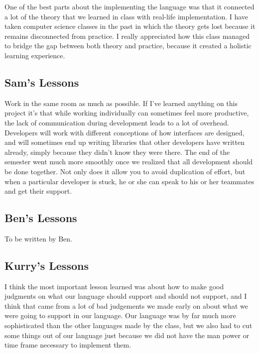 \documentclass{report}
\begin{document}
One of the best parts about the implementing the language was that it connected a lot of the theory that we learned in class with real-life implementation.  I have taken computer science classes in the past in which the theory gets lost because it remains disconnected from practice. I really appreciated how this class managed to bridge the gap between both theory and practice, because it created a holistic learning experience.



\subsection{Sam's Lessons}
\label{sub:sams-lessons}

Work in the same room as much as possible. If I've learned anything on this
project it's that while working individually can sometimes feel more
productive, the lack of communication during development leads to a lot of
overhead. Developers will work with different conceptions of how interfaces are
designed, and will sometimes end up writing libraries that other developers
have written already, simply because they didn't know they were there. The end
of the semester went much more smoothly once we realized that all development
should be done together. Not only does it allow you to avoid duplication of effort, but
when a particular developer is stuck, he or she can speak to his or her teammates and
get their support.

\subsection{Ben's Lessons} \label{sub:bens-lessons}

To be written by Ben.

\subsection{Kurry's Lessons}
\label{sub:kurrys-lessons}

I think the most important lesson learned was about how to make good judgments
on what our language should support and should not support, and I think that
came from a lot of bad judgements we made early on about what we were going to
support in our language. Our language was by far much more sophisticated than the
other languages made by the class, but we also had to cut some things out of our
language just because we did not have the man power or time frame necessary to
implement them. 
\end{document}
